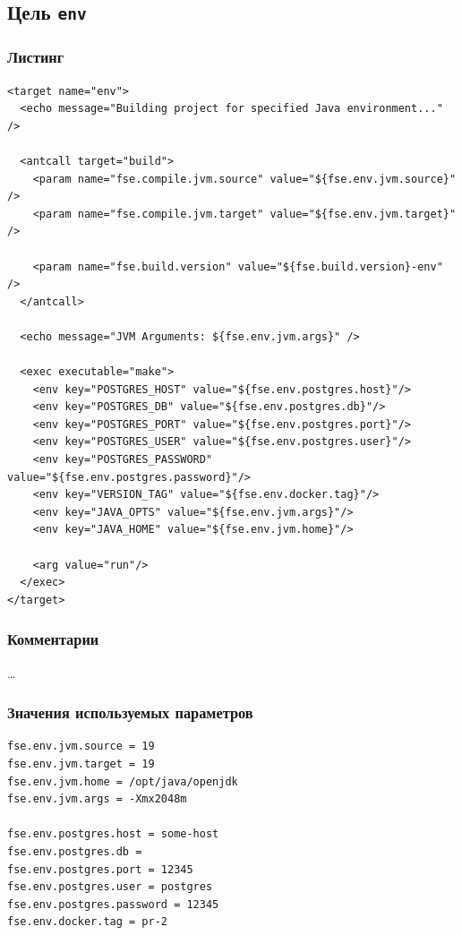 \subsection{Цель \texttt{env}}

\subsubsection{Листинг}

\begin{lstlisting}[caption={Часть содержимого файла \texttt{build.xml}},captionpos=b]
<target name="env">
  <echo message="Building project for specified Java environment..." />

  <antcall target="build">
    <param name="fse.compile.jvm.source" value="${fse.env.jvm.source}" />
    <param name="fse.compile.jvm.target" value="${fse.env.jvm.target}" />

    <param name="fse.build.version" value="${fse.build.version}-env" />
  </antcall>
  
  <echo message="JVM Arguments: ${fse.env.jvm.args}" />

  <exec executable="make">
    <env key="POSTGRES_HOST" value="${fse.env.postgres.host}"/>
    <env key="POSTGRES_DB" value="${fse.env.postgres.db}"/>
    <env key="POSTGRES_PORT" value="${fse.env.postgres.port}"/>
    <env key="POSTGRES_USER" value="${fse.env.postgres.user}"/>
    <env key="POSTGRES_PASSWORD" value="${fse.env.postgres.password}"/>
    <env key="VERSION_TAG" value="${fse.env.docker.tag}"/>
    <env key="JAVA_OPTS" value="${fse.env.jvm.args}"/>
    <env key="JAVA_HOME" value="${fse.env.jvm.home}"/>

    <arg value="run"/>
  </exec>
</target>
\end{lstlisting}

\subsubsection{Комментарии}

\dots

\subsubsection{Значения используемых параметров}

\begin{lstlisting}[language=Properties,caption={Часть содержимого файла \texttt{build.properties}},captionpos=b]
fse.env.jvm.source = 19
fse.env.jvm.target = 19
fse.env.jvm.home = /opt/java/openjdk
fse.env.jvm.args = -Xmx2048m

fse.env.postgres.host = some-host
fse.env.postgres.db = 
fse.env.postgres.port = 12345
fse.env.postgres.user = postgres
fse.env.postgres.password = 12345
fse.env.docker.tag = pr-2
\end{lstlisting}

